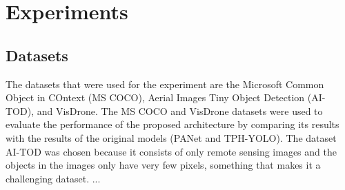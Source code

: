 \chapter{Experiments}

\section{Datasets}
The datasets that were used for the experiment are the Microsoft Common Object in COntext (MS COCO), Aerial Images Tiny Object Detection (AI-TOD), and VisDrone. The MS COCO and VisDrone datasets were used to evaluate the performance of the proposed architecture by comparing its results with the results of the original models (PANet and TPH-YOLO). The dataset AI-TOD was chosen because it consists of only remote sensing images and the objects in the images only have very few pixels, something that makes it a challenging dataset. ...
